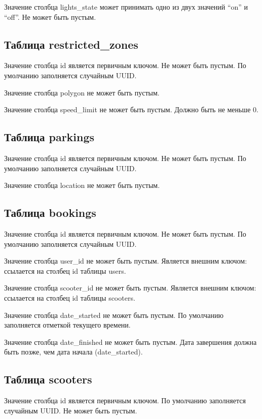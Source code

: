 Значение столбца lights\_state может принимать одно из двух значений \enquote{on} и \enquote{off}. Не может быть пустым.

\subsection{Таблица restricted\_zones}

Значение столбца id является первичным ключом. Не может быть пустым. По умолчанию заполняется случайным UUID.

Значение столбца polygon не может быть пустым.

Значение столбца speed\_limit не может быть пустым. Должно быть не меньше 0.

\subsection{Таблица parkings}

Значение столбца id является первичным ключом. Не может быть пустым. По умолчанию заполняется случайным UUID.

Значение столбца location не может быть пустым.

\subsection{Таблица bookings}

Значение столбца id является первичным ключом. Не может быть пустым. По умолчанию заполняется случайным UUID.

Значение столбца user\_id не может быть пустым. Является внешним ключом: ссылается на столбец id таблицы users.

Значение столбца scooter\_id не может быть пустым. Является внешним ключом: ссылается на столбец id таблицы scooters.

Значение столбца date\_started не может быть пустым. По умолчанию заполняется отметкой текущего времени.

Значение столбца date\_finished не может быть пустым. Дата завершения должна быть позже, чем дата начала (date\_started).

\subsection{Таблица scooters}

Значение столбца id является первичным ключом. По умолчанию заполняется случайным UUID. Не может быть пустым.

